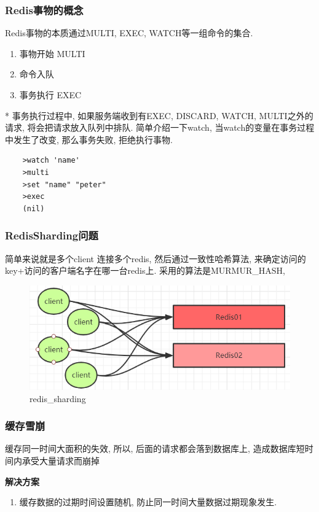 \documentclass[UTF8]{ctexart}
\begin{document}
\subsubsection{Redis事物的概念}
Redis事物的本质通过MULTI, EXEC, WATCH等一组命令的集合.
\begin{enumerate}

	\item 事物开始 MULTI
	\item 命令入队
	\item 事务执行 EXEC
\end{enumerate}
* 事务执行过程中, 如果服务端收到有EXEC, DISCARD, WATCH, MULTI之外的请求, 将会把请求放入队列中排队.
简单介绍一下watch, 当watch的变量在事务过程中发生了改变, 那么事务失败, 拒绝执行事物.
\begin{lstlisting}
	>watch 'name'
	>multi
	>set "name" "peter"
	>exec
	(nil)
\end{lstlisting}
\subsubsection{RedisSharding问题}
简单来说就是多个client 连接多个redis, 然后通过一致性哈希算法, 来确定访问的key+访问的客户端名字在哪一台redis上.
采用的算法是MURMUR\_HASH,
\begin{figure}
	\centering
	\includegraphics[width=0.7\linewidth]{figures/redis_sharding.png}
	\caption{redis\_sharding}
	\label{fig:redissharding}
\end{figure}
\subsubsection{缓存雪崩}
缓存同一时间大面积的失效, 所以, 后面的请求都会落到数据库上, 造成数据库短时间内承受大量请求而崩掉

\par
\textbf{解决方案}
\begin{enumerate}

	\item 缓存数据的过期时间设置随机, 防止同一时间大量数据过期现象发生.

\end{enumerate}
\end{document}
